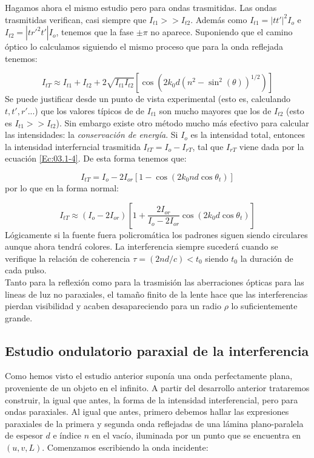 \documentclass[12pt,a4paper]{book}
\numberwithin{equation}{section}
\numberwithin{figure}{section}
\newcommand{\parentesis}[1]{\left( #1  \right)}
\newcommand{\ccorchetes}[1]{\left[ #1  \right]}
\newcommand{\1}{_{(1)}}
\newcommand{\2}{_{(2)}}
\theoremstyle{definition}
\begin{document}
Hagamos ahora el mismo estudio pero para ondas trasmitidas. Las ondas trasmitidas verifican, casi siempre que $I_{t1}>>I_{t2}$. Además como $I_{t1}=|tt'|^2I_o$ e $I_{t2} =|tr'^2t'|I_o$, tenemos que la fase $\pm \pi$ no aparece. Suponiendo que el camino óptico lo calculamos siguiendo el mismo proceso que para la onda reflejada tenemos:

\begin{equation}
I_{tT} \approx I_{t1} + I_{t2} + 2 \sqrt{I_{t1} I_{t2}} \ccorchetes{ \cos \parentesis{2 k_0 d \parentesis{n^2 - \sin^2 (\theta)}^{1/2}}}
\end{equation}
Se puede justificar desde un punto de vista experimental (esto es, calculando $t,t',r'...$) que los valores típicos de de $I_{t1}$ son mucho mayores que los de $I_{t2}$ (esto es $I_{t1}>>I_{t2}$). Sin embargo existe otro método mucho más efectivo para calcular las intensidades: la \textit{conservación de energía}. Si $I_o$ es la intensidad total, entonces la intensidad interferncial trasmitida $I_{tT}=I_o - I_{rT}$, tal que $I_{rT}$ viene dada por la ecuación \ref{Ec:03.1-4}. De esta forma tenemos que:

\begin{equation}
I_{tT} = I_o - 2 I_{or} \ccorchetes{1-\cos \parentesis{2k_0 n d \cos\theta_t}}
\end{equation}
por lo que en la forma normal:

\begin{equation}
I_{tT} \approx (I_o - 2 I_{or})\ccorchetes{1+ \frac{2I_{or}}{I_o - 2 I_{or}} \cos \parentesis{2k_0 d \cos \theta_t}}
\end{equation}
Lógicamente si la fuente fuera policromática los padrones siguen siendo circulares aunque ahora tendrá colores. La interferencia siempre sucederá cuando se verifique la relación de coherencia $\tau = (2nd/c)<t_0$ siendo $t_0$ la duración de cada pulso. \\

Tanto para la reflexión como para la trasmisión las aberraciones ópticas para las lineas de luz no paraxiales, el tamaño finito de la lente hace que las interferencias pierdan visibilidad y acaben desapareciendo para un radio $\rho$ lo suficientemente grande.  

\subsection{Estudio ondulatorio paraxial de la interferencia}

Como hemos visto el estudio anterior suponía una onda perfectamente plana, proveniente de un objeto en el infinito. A partir del desarrollo anterior trataremos construir, la igual que antes, la forma de la intensidad interferencial, pero para ondas paraxiales. Al igual que antes, primero debemos hallar las expresiones paraxiales de la primera y segunda onda reflejadas de una lámina plano-paralela de espesor $d$ e índice $n$ en el vacío, iluminada por un punto que se encuentra en $(u,v,L)$. Comenzamos escribiendo la onda incidente:
\end{document}
